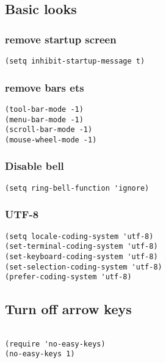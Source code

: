 \documentclass[12pt]{article}
\begin{document}
\subsection{Basic looks}
\label{sec:org871bf07}
\subsubsection{remove startup screen}
\label{sec:org4307ef2}
\begin{verbatim}
(setq inhibit-startup-message t) 
\end{verbatim}

\subsubsection{remove bars ets}
\label{sec:orgd941f9d}
\begin{verbatim}
(tool-bar-mode -1)
(menu-bar-mode -1)
(scroll-bar-mode -1)
(mouse-wheel-mode -1)
\end{verbatim}
\subsubsection{Disable bell}
\label{sec:org292a529}
\begin{verbatim}
(setq ring-bell-function 'ignore)
\end{verbatim}

\subsubsection{UTF-8}
\label{sec:org92c3a4e}

\begin{verbatim}
(setq locale-coding-system 'utf-8)
(set-terminal-coding-system 'utf-8)
(set-keyboard-coding-system 'utf-8)
(set-selection-coding-system 'utf-8)
(prefer-coding-system 'utf-8)
\end{verbatim}

\subsection{Turn off arrow keys}
\label{sec:org5cc6b98}

\begin{verbatim}

(require 'no-easy-keys)
(no-easy-keys 1)

\end{verbatim}
\end{document}
